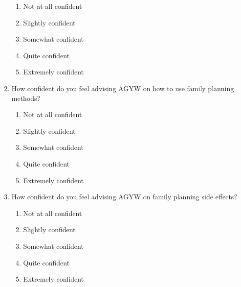 \begin{enumerate}
        \begin{enumerate}
            \item Not at all confident
            \item Slightly confident
            \item Somewhat confident
            \item Quite confident
            \item Extremely confident
        \end{enumerate}
    \item How confident do you feel advising AGYW on how to use family planning methods?
        \begin{enumerate}
            \item Not at all confident
            \item Slightly confident
            \item Somewhat confident
            \item Quite confident
            \item Extremely confident
        \end{enumerate}
    \item How confident do you feel advising AGYW on family planning side effects?
        \begin{enumerate}
            \item Not at all confident
            \item Slightly confident
            \item Somewhat confident
            \item Quite confident
            \item Extremely confident
        \end{enumerate}
\end{enumerate}


